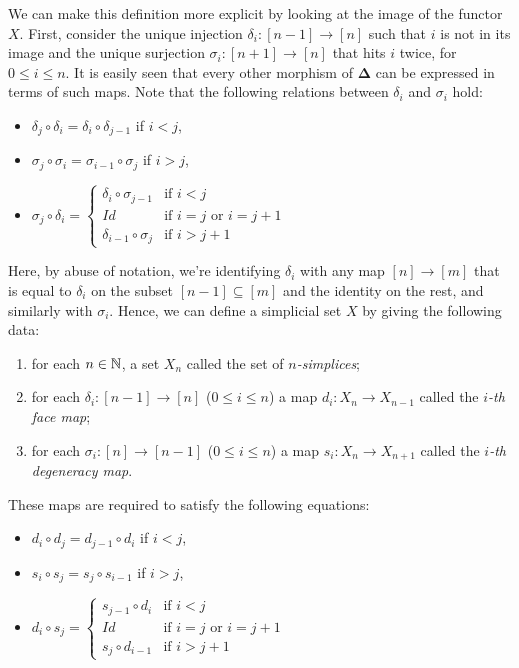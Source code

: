 \documentclass[TFM.tex]{subfiles}
\begin{document}
We can make this definition more explicit by looking at the image of the functor $X$. First, consider the unique injection $\delta_i:[n-1]\to[n]$ such that $i$ is not in its image and the unique surjection $\sigma_i:[n+1]\to [n]$ that hits $i$ twice, for $0\leq i\leq n$. It is easily seen that every other morphism of $\mathbf{\Delta}$ can be expressed in terms of such maps. Note that the following relations between $\delta_i$ and $\sigma_i$ hold:
\begin{itemize}
\item $\delta_j\circ\delta_i=\delta_i\circ \delta_{j-1}$ if $i<j$,
\item $\sigma_j\circ \sigma_i=\sigma_{i-1}\circ \sigma_j$ if $i>j$,
\item $\sigma_j\circ\delta_i=\begin{cases}
\delta_i\circ \sigma_{j-1} &\text{if } i<j\\
Id & \text{if } i=j\text{ or }i=j+1\\
\delta_{i-1}\circ \sigma_j & \text{if }i>j+1
\end{cases}$
\end{itemize}
Here, by abuse of notation, we're identifying $\delta_i$ with any map $[n]\to[m]$ that is equal to $\delta_i$ on the subset $[n-1]\subseteq [m]$ and the identity on the rest, and similarly with $\sigma_i$. Hence, we can define a simplicial set $X$ by giving the following data:
\begin{enumerate}
\item for each $n\in\mathbb{N}$, a set $X_n$ called the set of \emph{$n$-simplices};
\item for each $\delta_i:[n-1]\to[n]$ ($0\leq i\leq n$) a map $d_i:X_n\to X_{n-1}$ called the \emph{$i$-th face map};
\item for each $\sigma_i:[n]\to[n-1]$ ($0\leq i\leq n$) a map $s_i:X_n\to X_{n+1}$ called the \emph{$i$-th degeneracy map}.
\end{enumerate} 
These maps are required to satisfy the following equations:
\begin{itemize}
\item $d_i \circ d_j  = d_{j-1} \circ d_i$ if $i<j$,
\item $s_i \circ s_j  = s_j \circ s_{i-1}$ if $i>j$,
\item $d_i \circ s_j =  \begin{cases} s_{j-1} \circ d_i &  \text{if }  i < j \\ Id & \text{if }  i = j \text{ or } i = j+1 \\ s_j \circ d_{i-1} &  \text{if }i > j+1  \end{cases}$
\end{itemize}
\end{document}
